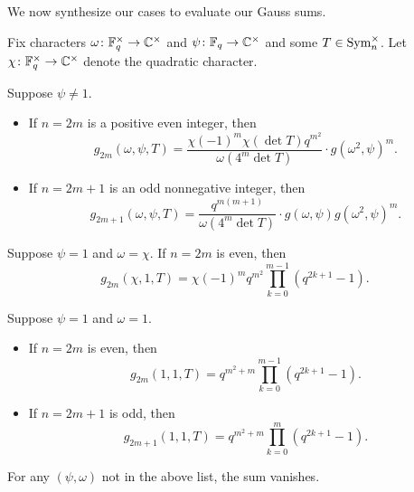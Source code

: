 We now synthesize our cases to evaluate our Gauss sums.
\begin{theorem} \label{thm:gsum-sym}
    Fix characters $\omega\colon\mathbb F_q^\times\to\mathbb C^\times$ and $\psi\colon\mathbb F_q\to\mathbb C^\times$ and some $T\in\operatorname{Sym}_n^\times$. Let $\chi\colon\mathbb F_q^\times\to\mathbb C^\times$ denote the quadratic character.
    \begin{listalph}
        \item Suppose $\psi\ne1$.
        \begin{itemize}
            \item If $n=2m$ is a positive even integer, then
            \[g_{2m}(\omega,\psi,T)=\frac{\chi(-1)^m\chi(\det T)q^{m^2}}{\omega(4^m\det T)}\cdot g\left(\omega^2,\psi\right)^m.\]
            \item If $n=2m+1$ is an odd nonnegative integer, then
            \[g_{2m+1}(\omega,\psi,T)=\frac{q^{m(m+1)}}{\omega(4^m\det T)}\cdot g(\omega,\psi)g\left(\omega^2,\psi\right)^m.\]
        \end{itemize}
        \item Suppose $\psi=1$ and $\omega=\chi$. If $n=2m$ is even, then
        \[g_{2m}(\chi,1,T)=\chi(-1)^mq^{m^2}\prod_{k=0}^{m-1}\left(q^{2k+1}-1\right).\]
        \item Suppose $\psi=1$ and $\omega=1$.
        \begin{itemize}
            \item If $n=2m$ is even, then
            \[g_{2m}(1,1,T)=q^{m^2+m}\prod_{k=0}^{m-1}\left(q^{2k+1}-1\right).\]
            \item If $n=2m+1$ is odd, then
            \[g_{2m+1}(1,1,T)=q^{m^2+m}\prod_{k=0}^{m}\left(q^{2k+1}-1\right).\]
        \end{itemize}
    \end{listalph}
    For any $(\psi,\omega)$ not in the above list, the sum vanishes.
\end{theorem}
